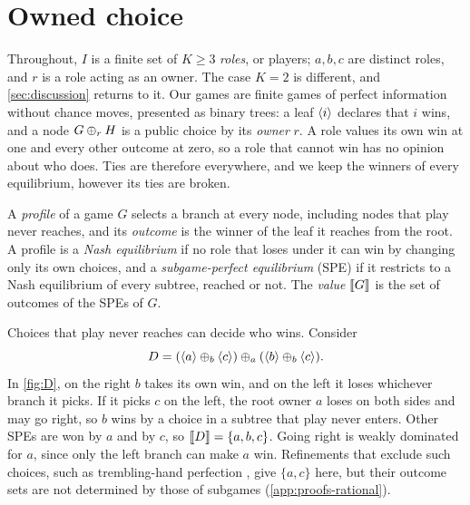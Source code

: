 \section{Owned choice}\label{sec:rational}

Throughout, $I$ is a finite set of $K\geq3$ \emph{roles}, or players; $a,b,c$ are distinct roles, and $r$ is a role acting as an owner. The case $K=2$ is different, and \cref{sec:discussion} returns to it. Our games are finite games of perfect information without chance moves, presented as binary trees: a leaf $\langle i\rangle$ declares that $i$ wins, and a node $G\mathbin{\oplus_{r}} H$ is
a public choice by its \emph{owner} $r$. A role values its own win at one and every other outcome at zero, so a role that cannot win has no opinion about who does. Ties are therefore everywhere, and we keep the winners of every equilibrium, however its ties are broken.

\begin{definition}\label{game:def:spe}
A \emph{profile} of a game $G$ selects a branch at every node, including nodes that play never reaches, and its \emph{outcome} is the winner of the leaf it reaches from the root. A profile is a \emph{Nash equilibrium} if no role that loses under it can win by changing only its own choices, and a \emph{subgame-perfect equilibrium} (SPE) if it restricts to a Nash equilibrium of every subtree, reached or not. The \emph{value} $\llbracket G\rrbracket$ is the set of outcomes of the SPEs of $G$.
\end{definition}

Choices that play never reaches can decide who wins. Consider
\[
 D=(\langle a\rangle\mathbin{\oplus_{b}}\langle c\rangle)\mathbin{\oplus_{a}}(\langle b\rangle\mathbin{\oplus_{b}}\langle c\rangle).
\]
In \cref{fig:D}, on the right $b$ takes its own win, and on the left it loses whichever branch it picks. If it picks $c$ on the left, the root owner $a$ loses on both sides and may go right, so $b$ wins by a choice in a subtree that play never enters. Other SPEs are won by $a$ and by $c$, so $\llbracket D\rrbracket=\{a,b,c\}$. Going right is weakly dominated for $a$, since only the left branch can make $a$ win. Refinements that exclude such choices, such as trembling-hand perfection \cite{Selten1975}, give $\{a,c\}$ here, but their outcome sets are not determined by those of subgames (\cref{app:proofs-rational}).

